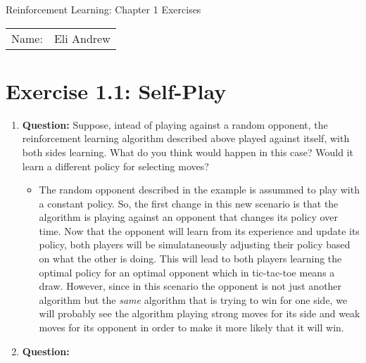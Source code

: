 \documentclass[12pt]{article}
\begin{document}
\begin{center}
{\Large Reinforcement Learning: Chapter 1 Exercises}

\begin{tabular}{rl}
Name: & Eli Andrew
\end{tabular}
\end{center}

\section*{Exercise 1.1: Self-Play}

\begin{enumerate}[label=(\alph*)]
  \item \textbf{Question:} Suppose, intead of playing against a random opponent, 
  the reinforcement learning algorithm described above played against itself, 
  with both sides learning. What do you think would happen in this case? 
  Would it learn a different policy for selecting moves?
  \begin{itemize}
    \item The random opponent described in the example is assummed to play with 
    a constant policy. So, the first change in this new scenario is that the 
    algorithm is playing against an opponent that changes its policy over time.
    Now that the opponent will learn from its experience and update its policy,
    both players will be simulataneously adjusting their policy based on what the 
    other is doing. This will lead to both players learning the optimal policy for
    an optimal opponent which in tic-tac-toe means a draw. However, since in this
    scenario the opponent is not just another algorithm but the \textit{same} algorithm
    that is trying to win for one side, we will probably see the algorithm playing 
    strong moves for its side and weak moves for its opponent in order to make it
    more likely that it will win.
  \end{itemize}

  \item \textbf{Question:}

\end{enumerate}
\end{document}
